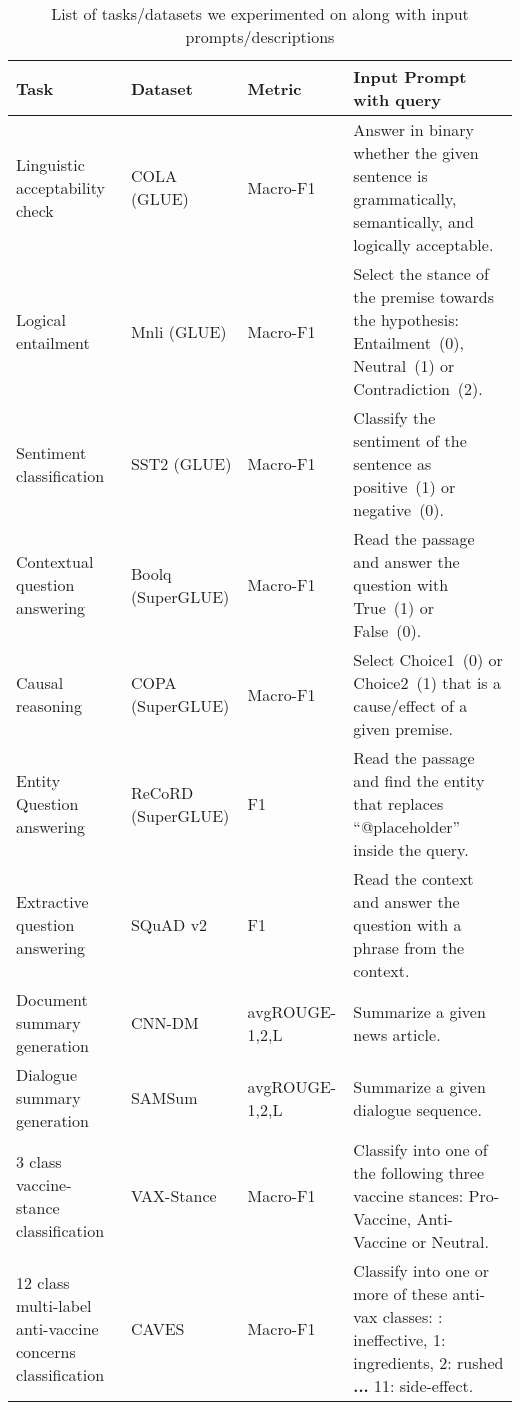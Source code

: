 \begin{table*}[ht]
    \centering
    \footnotesize
    \begin{tabular}{p{40mm}|p{16mm}|p{15mm}|p{70mm}}
    \toprule
    \textbf{Task} &   \textbf{Dataset} & \textbf{Metric} & \textbf{Input Prompt with query} \\
    \midrule
    Linguistic acceptability check & COLA (GLUE) & Macro-F1 & Answer in binary whether the given sentence is grammatically, semantically, and logically acceptable. \\
    Logical entailment & Mnli (GLUE) & Macro-F1 & Select the stance of the premise towards the hypothesis: Entailment~(0), Neutral~(1) or Contradiction~(2). \\
    Sentiment classification & SST2 (GLUE) & Macro-F1 & Classify the sentiment of the sentence as positive~(1) or negative~(0). \\
    
    \hline
    Contextual question answering & Boolq (SuperGLUE) & Macro-F1 & Read the passage and answer the question with True~(1) or False~(0). \\
    Causal reasoning & COPA (SuperGLUE) & Macro-F1 & Select Choice1~(0) or Choice2~(1) that is a cause/effect of a given premise. \\
    Entity Question answering & ReCoRD (SuperGLUE) & F1 & Read the passage and find the entity that replaces ``@placeholder'' inside the query. \\
    Extractive question answering & SQuAD v2 & F1 & Read the context and answer the question with a phrase from the context. \\

    
    \hline
    Document summary generation & CNN-DM & avgROUGE-1,2,L & Summarize a given news article. \\
    Dialogue summary generation & SAMSum & avgROUGE-1,2,L  & Summarize a given dialogue sequence. \\
    
    \hline
    3 class vaccine-stance classification & VAX-Stance & Macro-F1 & Classify into one of the following three vaccine stances: Pro-Vaccine, Anti-Vaccine or Neutral. \\
    12 class multi-label anti-vaccine concerns classification & CAVES & Macro-F1 & Classify into one or more of these anti-vax classes: \qquad 0: ineffective, 1: ingredients, 2: rushed \textbf{...} 11: side-effect. \\
    \bottomrule
    \end{tabular}
    \caption{List of tasks/datasets we experimented on along with input prompts/descriptions}
    \label{tab:tasks-app}
\end{table*}
